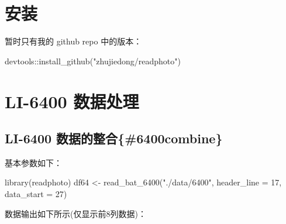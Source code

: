 \documentclass[
]{krantz}
\makeatletter
\newenvironment{Shaded}{\begin{snugshade}}{\end{snugshade}}
\newcommand{\AttributeTok}[1]{\textcolor[rgb]{0.77,0.63,0.00}{#1}}
\newcommand{\DecValTok}[1]{\textcolor[rgb]{0.00,0.00,0.81}{#1}}
\newcommand{\FunctionTok}[1]{\textcolor[rgb]{0.00,0.00,0.00}{#1}}
\newcommand{\NormalTok}[1]{#1}
\newcommand{\OtherTok}[1]{\textcolor[rgb]{0.56,0.35,0.01}{#1}}
\newcommand{\SpecialCharTok}[1]{\textcolor[rgb]{0.00,0.00,0.00}{#1}}
\newcommand{\StringTok}[1]{\textcolor[rgb]{0.31,0.60,0.02}{#1}}
\newenvironment{kframe}{%
\medskip{}
\setlength{\fboxsep}{.8em}
 \def\at@end@of@kframe{}%
 \ifinner\ifhmode%
  \def\at@end@of@kframe{\end{minipage}}%
  \begin{minipage}{\columnwidth}%
 \fi\fi%
 \def\FrameCommand##1{\hskip\@totalleftmargin \hskip-\fboxsep
 \colorbox{shadecolor}{##1}\hskip-\fboxsep
     \hskip-\linewidth \hskip-\@totalleftmargin \hskip\columnwidth}%
 \MakeFramed {\advance\hsize-\width
   \@totalleftmargin\z@ \linewidth\hsize
   \@setminipage}}%
 {\par\unskip\endMakeFramed%
 \at@end@of@kframe}
\renewenvironment{Shaded}{\begin{kframe}}{\end{kframe}}
\makeatother
\begin{document}
\hypertarget{install_readphoto}{%
\section{安装}\label{install_readphoto}}

暂时只有我的 github repo 中的版本：

\begin{Shaded}
\begin{Highlighting}[]
\NormalTok{devtools}\SpecialCharTok{::}\FunctionTok{install\_github}\NormalTok{(}\StringTok{"zhujiedong/readphoto"}\NormalTok{)}
\end{Highlighting}
\end{Shaded}

\hypertarget{batch64}{%
\section{LI-6400 数据处理}\label{batch64}}

\hypertarget{li-6400-ux6570ux636eux7684ux6574ux54086400combine}{%
\subsection{LI-6400 数据的整合\{\#6400combine\}}\label{li-6400-ux6570ux636eux7684ux6574ux54086400combine}}

基本参数如下：

\begin{Shaded}
\begin{Highlighting}[]
\FunctionTok{library}\NormalTok{(readphoto)}
\NormalTok{df64  }\OtherTok{\textless{}{-}} \FunctionTok{read\_bat\_6400}\NormalTok{(}\StringTok{"./data/6400"}\NormalTok{, }\AttributeTok{header\_line =} \DecValTok{17}\NormalTok{, }\AttributeTok{data\_start =} \DecValTok{27}\NormalTok{)}
\end{Highlighting}
\end{Shaded}

数据输出如下所示(仅显示前8列数据)：
\end{document}
